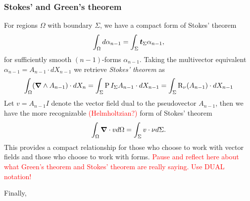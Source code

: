 \subsubsection{Stokes' and Green's theorem}

For regions $\Omega$ with boundary $\Sigma$, we have a compact form of Stokes' theorem
\[
\int_\Omega d \alpha_{n-1} = \int_\Sigma \boldsymbol{t}_\Sigma \alpha_{n-1},
\]
for sufficiently smooth $(n-1)$-forms $\alpha_{n-1}$. Taking the multivector equivalent $\alpha_{n-1} = A_{n-1} \cdot dX_{n-1}$ we retrieve \emph{Stokes' theorem} as
\[
\int_\Omega (\boldsymbol{\nabla} \wedge A_{n-1}) \cdot dX_n = \int_\Sigma \operatorname{P}{I_\Sigma}{A_{n-1}} \cdot dX_{n-1}  = \int_\Sigma \operatorname{R}_{\nu}(A_{n-1}) \cdot dX_{n-1}
\]
Let $v = A_{n-1} I$ denote the vector field dual to the pseudovector $A_{n-1}$, then we have the more recognizable \textcolor{red}{(Helmholtzian?)} form of Stokes' theorem
\[
\int_\Omega \boldsymbol{\nabla} \cdot v d\Omega = \int_\Sigma v \cdot \nu d\Sigma.
\]
 This provides a compact relationship for those who choose to work with vector fields and those who choose to work with forms. \textcolor{red}{Pause and reflect here about what Green's theorem and Stokes' theorem are really saying. Use DUAL notation!}

Finally,




